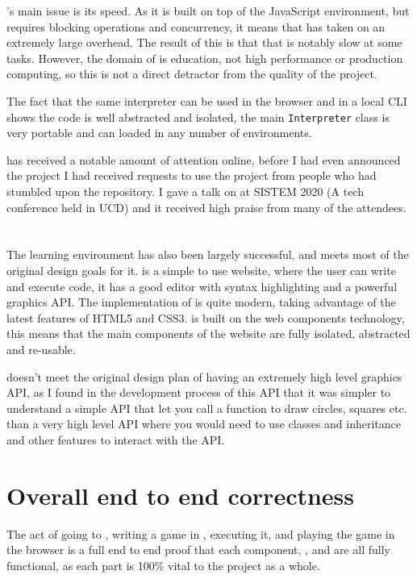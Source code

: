 \Setanta{}'s main issue is its speed. As it is built on top of the JavaScript environment, but requires blocking operations and concurrency, it means that \Setanta{} has taken on an extremely large overhead. The result of this is that that \Setanta{} is notably slow at some tasks. However, the domain of \Setanta{} is education, not high performance or production computing, so this is not a direct detractor from the quality of the project.

The fact that the same \Setanta{} interpreter can be used in the browser and in a local CLI shows the code is well abstracted and isolated, the main \lstinline|Interpreter| class is very portable and can loaded in any number of environments.

\Setanta{} has received a notable amount of attention online, before I had even announced the project I had received requests to use the project from people who had stumbled upon the repository. I gave a talk on \Setanta{} at SISTEM 2020 (A tech conference held in UCD) and it received high praise from many of the attendees.

\section{\trys{}}

The \trys{} learning environment has also been largely successful, and meets most of the original design goals for it. \trys{} is a simple to use website, where the user can write and execute \Setanta{} code, it has a good editor with syntax highlighting and a powerful graphics API.
The implementation of \trys{} is quite modern, taking advantage of the latest features of HTML5 and CSS3. \trys{} is built on the web components technology, this means that the main components of the \trys{} website are fully isolated, abstracted and re-usable.

\trys{} doesn't meet the original design plan of having an extremely high level graphics API, as I found in the development process of this API that it was simpler to understand a simple API that let you call a function to draw circles, squares etc. than a very high level API where you would need to use classes and inheritance and other features to interact with the API.

\section{Overall end to end correctness}

The act of going to \trys{}, writing a game in \Setanta{}, executing it, and playing the game in the browser is a full end to end proof that each component, \trys{}, \Setanta{} and \tsPEG{} are all fully functional, as each part is 100\% vital to the project as a whole.
